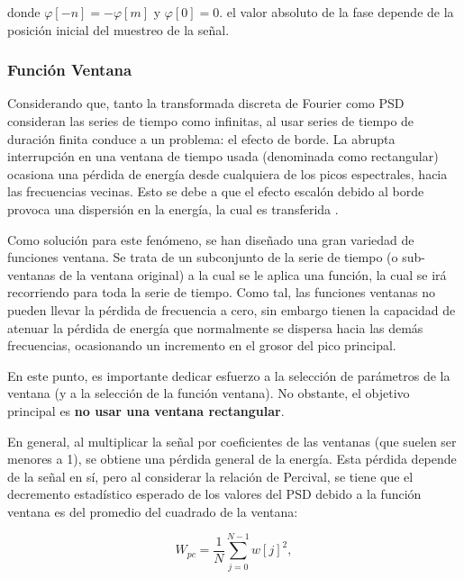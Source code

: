 donde $\varphi [-n] = -\varphi[m]$ y $\varphi[0]=0$. el valor absoluto de la fase depende de la posición inicial del muestreo de la señal.
\vspace{1 em}

\subsubsection{Función Ventana}

Considerando que, tanto la transformada discreta de Fourier como PSD consideran las series de tiempo como infinitas, al usar series de tiempo de duración finita conduce a un problema: el efecto de borde. La abrupta interrupción en una ventana de tiempo usada (denominada como rectangular) ocasiona una pérdida de energía desde cualquiera de los picos espectrales, hacia las frecuencias vecinas. Esto se debe a que el efecto escalón debido al borde provoca una dispersión en la energía, la cual es transferida \cite{book_analysis_Method_multiSp_data}.
\vspace{1 em}

Como solución para este fenómeno, se han diseñado una gran variedad de funciones ventana. Se trata de un subconjunto de la serie de tiempo (o sub-ventanas de la ventana original) a la cual se le aplica una función, la cual se irá recorriendo para toda la serie de tiempo. Como tal, las funciones ventanas no pueden llevar la pérdida de frecuencia a cero, sin embargo tienen la capacidad de atenuar la pérdida de energía que normalmente se dispersa hacia las demás frecuencias, ocasionando un incremento en el grosor del pico principal.
\vspace{1 em}

En este punto, es importante dedicar esfuerzo a la selección de parámetros de la ventana (y a la selección de la función ventana). No obstante, el objetivo principal es \textbf{no usar una ventana rectangular}.
\vspace{1 em}

En general, al multiplicar la señal por coeficientes de las ventanas (que suelen ser menores a 1), se obtiene una pérdida general de la energía. Esta pérdida depende de la señal en sí, pero al considerar la relación de Percival, se tiene que el decremento estadístico esperado de los valores del PSD debido a la función ventana es del promedio del cuadrado de la ventana:

\begin{equation}
    W_{pc} = \frac{1}{N} \sum_{j=0}^{N-1} w[j]^2,
\end{equation}

